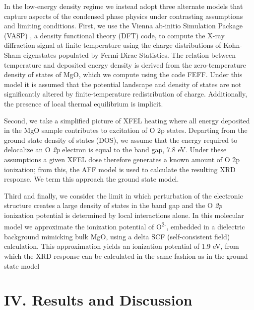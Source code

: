 In the low-energy density regime we instead adopt three alternate models
that capture aspects of the condensed phase physics under contrasting
assumptions and limiting conditions. First, we use the Vienna ab-initio
Simulation Package (VASP) \cite{hafner2008ab}, a density functional theory (DFT)
code, to compute the X-ray diffraction signal at finite temperature
using the charge distributions of Kohn-Sham eigenstates populated by
Fermi-Dirac Statistics. The relation between temperature and deposited
energy density is derived from the zero-temperature density of states of
MgO, which we compute using the code FEFF. \cite{ankudinov1998real} Under this model it
is assumed that the potential landscape and density of states are not
significantly altered by finite-temperature redistribution of charge.
Additionally, the presence of local thermal equilibrium is implicit.

Second, we take a simplified picture of XFEL heating where all energy
deposited in the MgO sample contributes to excitation of O 2p states.
Departing from the ground state density of states (DOS), we assume that
the energy required to delocalize an O \emph{2p} electron is equal to
the band gap, 7.8 eV. Under these assumptions a given XFEL dose
therefore generates a known amount of O 2p ionization; from this, the
AFF model is used to calculate the resulting XRD response. We term this
approach the ground state model.

Third and finally, we consider the limit in which perturbation of the
electronic structure creates a large density of states in the band gap
and the O \emph{2p} ionization potential is determined by local
interactions alone. In this molecular model we approximate the
ionization potential of O\textsuperscript{2-}, embedded in a dielectric
background mimicking bulk MgO, using a delta SCF (self-consistent field)
calculation. \cite{neese2006critical} This approximation yields an ionization potential
of 1.9 eV, from which the XRD response can be calculated in the same
fashion as in the ground state model

\section{IV. Results and Discussion}

